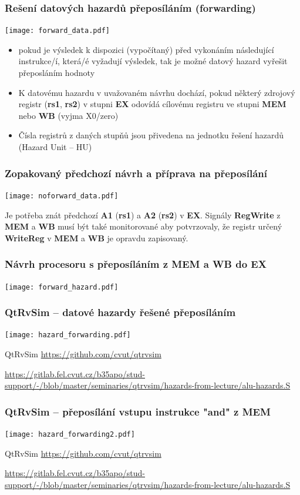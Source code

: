 \documentclass{beamer}
\begin{document}
\begin{frame}
\frametitle{Rešení datových hazardů přeposíláním (forwarding)}
\texttt{[image: forward\_data.pdf]}

\begin{itemize}
 \item pokud je výsledek k dispozici (vypočítaný) před vykonáním následující instrukce/í,
       která/é vyžadují výsledek, tak je možné datový hazard vyřešit přeposláním hodnoty
 \item K datovému hazardu v uvažovaném návrhu dochází, pokud některý zdrojový registr
       (\textbf{rs1}, \textbf{rs2}) v stupni \textbf{EX} odovídá cílovému registru
       ve stupni \textbf{MEM} nebo \textbf{WB} (vyjma X0/zero)
 \item Čísla registrů z daných stupňů jsou přivedena na jednotku řešení hazardů (Hazard Unit -- HU)
\end{itemize}

\end{frame}

\begin{frame}
\frametitle{Zopakovaný předchozí návrh a příprava na přeposílání}
\texttt{[image: noforward\_data.pdf]}

Je potřeba znát předchozí \textbf{A1} (\textbf{rs1}) a \textbf{A2} (\textbf{rs2}) v \textbf{EX}.
Signály \textbf{RegWrite} z \textbf{MEM} a \textbf{WB} musí být také monitorované aby potvrzovaly,
že registr určený \textbf{WriteReg} v \textbf{MEM} a \textbf{WB} je opravdu zapisovaný.

\end{frame}

\begin{frame}
\frametitle{Návrh procesoru s přeposíláním z MEM a WB do EX}
\texttt{[image: forward\_hazard.pdf]}
\end{frame}

\begin{frame}
\frametitle{QtRvSim -- datové hazardy řešené přeposíláním}
\texttt{[image: hazard\_forwarding.pdf]}

{\tiny
QtRvSim \url{https://github.com/cvut/qtrvsim}
}

{\Tiny
\url{https://gitlab.fel.cvut.cz/b35apo/stud-support/-/blob/master/seminaries/qtrvsim/hazards-from-lecture/alu-hazards.S}
}

\end{frame}

\begin{frame}
\frametitle{QtRvSim -- přeposílání vstupu instrukce "and" z MEM}
\texttt{[image: hazard\_forwarding2.pdf]}

{\tiny
QtRvSim \url{https://github.com/cvut/qtrvsim}
}

{\Tiny
\url{https://gitlab.fel.cvut.cz/b35apo/stud-support/-/blob/master/seminaries/qtrvsim/hazards-from-lecture/alu-hazards.S}
}

\end{frame}
\end{document}
